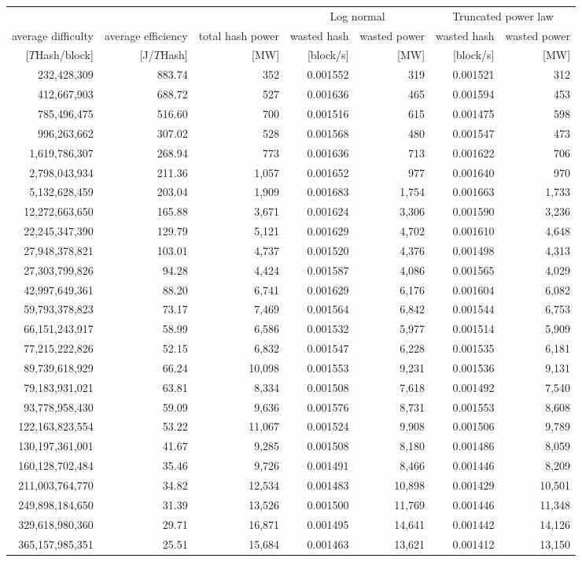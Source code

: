 \begin{tabular}{@{}rrrrrrr@{}}
\toprule
 &  &  & \multicolumn{2}{c}{Log normal} & \multicolumn{2}{c}{Truncated power law}\\
\cmidrule(lr){4-5} \cmidrule(lr){6-7} 
average difficulty & average efficiency & total hash power & wasted hash & wasted power & wasted hash & wasted power\\
$[T$Hash/block] & [J/$T$Hash] & [MW] & [block/s] & [MW] & [block/s] & [MW]\\
\cmidrule(lr){1-7}
232,428,309 & 883.74 & 352 & 0.001552 & 319 & 0.001521 & 312 \\
412,667,903 & 688.72 & 527 & 0.001636 & 465 & 0.001594 & 453 \\
785,496,475 & 516.60 & 700 & 0.001516 & 615 & 0.001475 & 598 \\
996,263,662 & 307.02 & 528 & 0.001568 & 480 & 0.001547 & 473 \\
1,619,786,307 & 268.94 & 773 & 0.001636 & 713 & 0.001622 & 706 \\
2,798,043,934 & 211.36 & 1,057 & 0.001652 & 977 & 0.001640 & 970 \\
5,132,628,459 & 203.04 & 1,909 & 0.001683 & 1,754 & 0.001663 & 1,733 \\
12,272,663,650 & 165.88 & 3,671 & 0.001624 & 3,306 & 0.001590 & 3,236 \\
22,245,347,390 & 129.79 & 5,121 & 0.001629 & 4,702 & 0.001610 & 4,648 \\
27,948,378,821 & 103.01 & 4,737 & 0.001520 & 4,376 & 0.001498 & 4,313 \\
27,303,799,826 & 94.28 & 4,424 & 0.001587 & 4,086 & 0.001565 & 4,029 \\
42,997,649,361 & 88.20 & 6,741 & 0.001629 & 6,176 & 0.001604 & 6,082 \\
59,793,378,823 & 73.17 & 7,469 & 0.001564 & 6,842 & 0.001544 & 6,753 \\
66,151,243,917 & 58.99 & 6,586 & 0.001532 & 5,977 & 0.001514 & 5,909 \\
77,215,222,826 & 52.15 & 6,832 & 0.001547 & 6,228 & 0.001535 & 6,181 \\
89,739,618,929 & 66.24 & 10,098 & 0.001553 & 9,231 & 0.001536 & 9,131 \\
79,183,931,021 & 63.81 & 8,334 & 0.001508 & 7,618 & 0.001492 & 7,540 \\
93,778,958,430 & 59.09 & 9,636 & 0.001576 & 8,731 & 0.001553 & 8,608 \\
122,163,823,554 & 53.22 & 11,067 & 0.001524 & 9,908 & 0.001506 & 9,789 \\
130,197,361,001 & 41.67 & 9,285 & 0.001508 & 8,180 & 0.001486 & 8,059 \\
160,128,702,484 & 35.46 & 9,726 & 0.001491 & 8,466 & 0.001446 & 8,209 \\
211,003,764,770 & 34.82 & 12,534 & 0.001483 & 10,898 & 0.001429 & 10,501 \\
249,898,184,650 & 31.39 & 13,526 & 0.001500 & 11,769 & 0.001446 & 11,348 \\
329,618,980,360 & 29.71 & 16,871 & 0.001495 & 14,641 & 0.001442 & 14,126 \\
365,157,985,351 & 25.51 & 15,684 & 0.001463 & 13,621 & 0.001412 & 13,150 \\
\bottomrule
\end{tabular}
